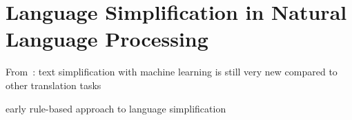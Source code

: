 %
%
%
%
%
%
%
%
%
%
%
%
%
%
%
%
%
%
%
%
%
%
%
%
%
%
%
%
%
%
%
%
%
%
%
%
%

\section{Language Simplification in Natural Language Processing}\label{sec:langSimp}


From~\autocite{schomacker2023data}:
text simplification with machine learning is still very new compared to other translation tasks



early rule-based approach to language simplification~\autocite{suter2016}







